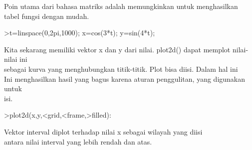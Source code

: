 \documentclass[a4paper,10pt]{article}
\begin{document}
\begin{eulernotebook}
\begin{eulercomment}
\begin{eulercomment}
\begin{eulercomment}
\begin{eulercomment}
\begin{eulercomment}
\begin{eulercomment}
\begin{eulercomment}
\begin{eulercomment}
\begin{eulercomment}
\begin{eulercomment}
\begin{eulercomment}
\begin{eulercomment}
\begin{eulercomment}
\begin{eulercomment}
\begin{eulercomment}
Poin utama dari bahasa matriks adalah memungkinkan untuk menghasilkan
tabel fungsi dengan mudah.
\end{eulercomment}
\begin{eulerprompt}
>t=linspace(0,2pi,1000); x=cos(3*t); y=sin(4*t);
\end{eulerprompt}
\begin{eulercomment}
Kita sekarang memiliki vektor x dan y dari nilai. plot2d() dapat
memplot nilai-nilai ini\\
sebagai kurva yang menghubungkan titik-titik. Plot bisa diisi. Dalam
hal ini\\
Ini menghasilkan hasil yang bagus karena aturan penggulitan, yang
digunakan untuk\\
isi.
\end{eulercomment}
\begin{eulerprompt}
>plot2d(x,y,<grid,<frame,>filled):
\end{eulerprompt}
\begin{eulercomment}
Vektor interval diplot terhadap nilai x sebagai wilayah yang diisi\\
antara nilai interval yang lebih rendah dan atas.


\end{eulercomment}
\end{eulercomment}
\end{eulercomment}
\end{eulercomment}
\end{eulercomment}
\end{eulercomment}
\end{eulercomment}
\end{eulercomment}
\end{eulercomment}
\end{eulercomment}
\end{eulercomment}
\end{eulercomment}
\end{eulercomment}
\end{eulercomment}
\end{eulercomment}
\end{eulernotebook}
\end{document}
